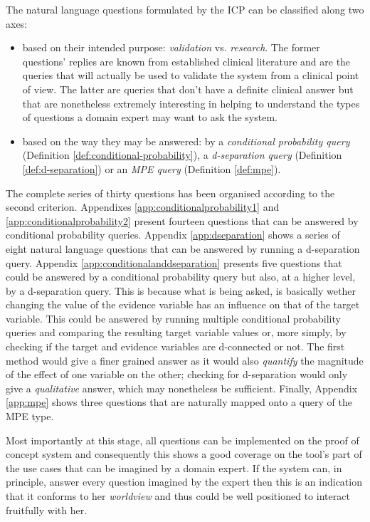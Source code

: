 The natural language questions formulated by the ICP can be classified along two axes:
\begin{itemize}
  \item based on their intended purpose: \textit{validation} vs. \textit{research}.
  The former questions' replies are known from established clinical literature and are the queries that will actually be used to validate the system from a clinical point of view.
  The latter are queries that don't have a definite clinical answer but that are nonetheless extremely interesting in helping to understand the types of questions a domain expert may want to ask the system.
  \item based on the way they may be answered: by a \textit{conditional probability query} (Definition \ref{def:conditional-probability}), a \textit{d-separation query} (Definition \ref{def:d-separation}) or an \textit{MPE query} (Definition \ref{def:mpe}).
\end{itemize}
The complete series of thirty questions has been organised according to the second criterion.
Appendixes \ref{app:conditionalprobability1} and \ref{app:conditionalprobability2} present fourteen questions that can be answered by conditional probability queries.
Appendix \ref{app:dseparation} shows a series of eight natural language questions that can be answered by running a d-separation query.
Appendix \ref{app:conditionalanddseparation} presents five questions that could be answered by a conditional probability query but also, at a higher level, by a d-separation query.
This is because what is being asked, is basically wether changing the value of the evidence variable has an influence on that of the target variable.
This could be answered by running multiple conditional probability queries and comparing the resulting target variable values or, more simply, by checking if the target and evidence variables are d-connected or not.
The first method would give a finer grained answer as it would also \textit{quantify} the magnitude of the effect of one variable on the other; checking for d-separation would only give a \textit{qualitative} answer, which may nonetheless be sufficient. 
Finally, Appendix \ref{app:mpe} shows three questions that are naturally mapped onto a query of the MPE type.

Most importantly at this stage, all questions can be implemented on the proof of concept system and consequently this shows a good coverage on the tool's part of the use cases that can be imagined by a domain expert.
If the system can, in principle, answer every question imagined by the expert then this is an indication that it conforms to her \textit{worldview} and thus could be well positioned to interact fruitfully with her.

